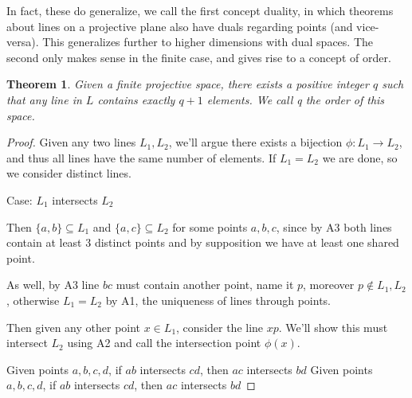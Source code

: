 \documentclass[12pt]{article}
\newtheorem{theorem}{Theorem}
\begin{document}
    In fact, these do generalize, we call the first concept duality,
    in which theorems about lines on a projective plane also have duals regarding points (and vice-versa).
    This generalizes further to higher dimensions with dual spaces.
    The second only makes sense in the finite case, and gives rise to a concept of order. \cite[p. 24]{beutelspacher_projective_2000}

    \begin{theorem}
        Given a finite projective space, there exists a positive integer $q$ such that any line in $L$ contains exactly $q+1$ elements.
        We call q the order of this space.
    \end{theorem}

    \begin{proof}
        Given any two lines $L_1, L_2$, we'll argue there exists a bijection $\phi: L_1 \rightarrow L_2$,
        and thus all lines have the same number of elements.
        If $L_1 = L_2$ we are done, so we consider distinct lines.

        Case: $L_1$ intersects $L_2$

        Then $\{a, b\} \subseteq L_1$ and $\{a, c\} \subseteq L_2$ for some points $a,b,c$,
        since by A3 both lines contain at least 3 distinct points and by supposition we have at least one shared point.

        As well, by A3 line $bc$ must contain another point, name it $p$, moreover $p \notin L_1, L_2$,
        otherwise $L_1 = L_2$ by A1, the uniqueness of lines through points.

        Then given any other point $x \in L_1$, consider the line $xp$.
        We'll show this must intersect $L_2$ using A2 and call the intersection point $\phi(x)$.

        \begin{figure}[h]
            \centering
            \label{fig:intersecting_lines}
        \end{figure}

        Given points $a,b,c,d$, if $ab$ intersects $cd$, then $ac$ intersects $bd$
        Given points $a,b,c,d$, if $ab$ intersects $cd$, then $ac$ intersects $bd$
    \end{proof}
\end{document}

